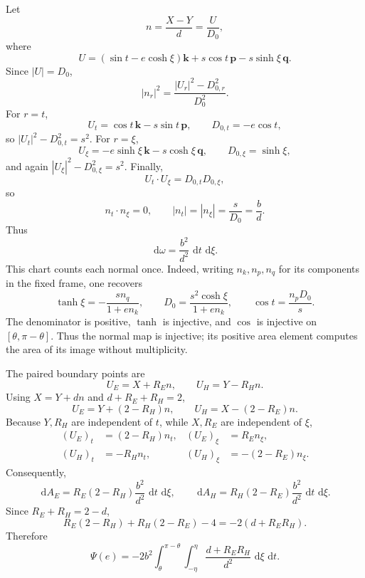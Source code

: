 \documentclass[11pt]{article}
\numberwithin{equation}{section}
\theoremstyle{remark}
\newcommand{\dd}{\,\mathrm d}
\begin{document}
Let
\[
  n=\frac{X-Y}{d}=\frac{U}{D_0},
\]
where
\[
  U=(\sin t-e\cosh\xi)\mathbf k
   +s\cos t\,\mathbf p-s\sinh\xi\,\mathbf q.
\]
Since \(|U|=D_0\),
\[
  |n_r|^2=\frac{|U_r|^2-D_{0,r}^2}{D_0^2}.
\]
For \(r=t\),
\[
  U_t=\cos t\,\mathbf k-s\sin t\,\mathbf p,
  \qquad D_{0,t}=-e\cos t,
\]
so \(|U_t|^2-D_{0,t}^2=s^2\).  For \(r=\xi\),
\[
  U_\xi=-e\sinh\xi\,\mathbf k-s\cosh\xi\,\mathbf q,
  \qquad D_{0,\xi}=\sinh\xi,
\]
and again \(|U_\xi|^2-D_{0,\xi}^2=s^2\).  Finally,
\[
  U_t\cdot U_\xi=D_{0,t}D_{0,\xi},
\]
so
\begin{equation}
  n_t\cdot n_\xi=0,
  \qquad
  |n_t|=|n_\xi|=\frac{s}{D_0}=\frac bd.
  \label{eq:conformal}
\end{equation}
Thus
\begin{equation}
  \dd\omega=\frac{b^2}{d^2}\,\dd t\,\dd\xi.
  \label{eq:area-element}
\end{equation}
This chart counts each normal once.  Indeed, writing \(n_k,n_p,n_q\)
for its components in the fixed frame, one recovers
\[
  \tanh\xi=-\frac{s n_q}{1+e n_k},\qquad
  D_0=\frac{s^2\cosh\xi}{1+e n_k},\qquad
  \cos t=\frac{n_pD_0}{s}.
\]
The denominator is positive, \(\tanh\) is injective, and \(\cos\) is
injective on \([\theta,\pi-\theta]\).  Thus the normal map is injective;
its positive area element computes the area of its image without multiplicity.

The paired boundary points are
\[
  U_E=X+R_En,
  \qquad
  U_H=Y-R_Hn.
\]
Using \(X=Y+dn\) and \(d+R_E+R_H=2\),
\[
  U_E=Y+(2-R_H)n,
  \qquad
  U_H=X-(2-R_E)n.
\]
Because \(Y,R_H\) are independent of \(t\), while \(X,R_E\) are independent of \(\xi\),
\begin{align*}
  (U_E)_t&=(2-R_H)n_t,& (U_E)_\xi&=R_En_\xi,\\
  (U_H)_t&=-R_Hn_t,& (U_H)_\xi&=-(2-R_E)n_\xi.
\end{align*}
Consequently,
\[
  \dd A_E=R_E(2-R_H)\frac{b^2}{d^2}\,\dd t\,\dd\xi,
  \qquad
  \dd A_H=R_H(2-R_E)\frac{b^2}{d^2}\,\dd t\,\dd\xi.
\]
Since \(R_E+R_H=2-d\),
\[
  R_E(2-R_H)+R_H(2-R_E)-4=-2(d+R_ER_H).
\]
Therefore
\begin{equation}
  \Psi(e)
  =-2b^2\int_\theta^{\pi-\theta}\int_{-\eta}^{\eta}
  \frac{d+R_ER_H}{d^2}\,\dd\xi\,\dd t.
  \label{eq:psi-2d}
\end{equation}
\end{document}
